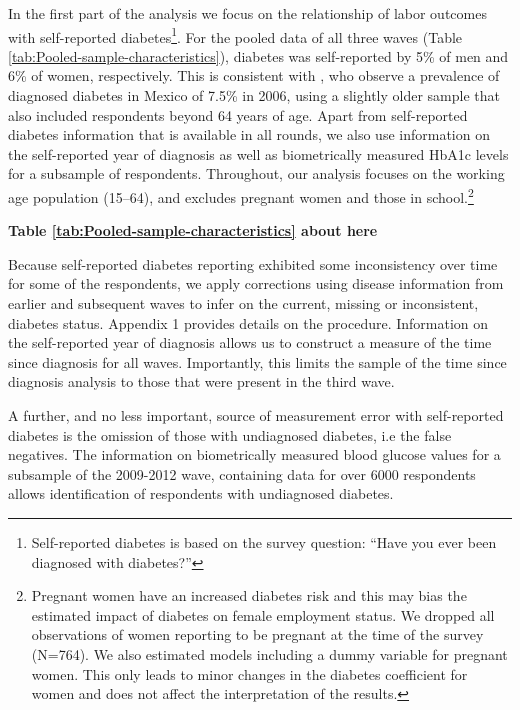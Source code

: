 \documentclass[12pt,english]{article}
\begin{document}
In the first part of the analysis we focus on the relationship of labor outcomes with self-reported diabetes\footnote{Self-reported diabetes is based on the survey question: “Have you ever been diagnosed with diabetes?”}. For the pooled data of all three waves (Table \ref{tab:Pooled-sample-characteristics}), diabetes was self-reported by 5\% of men and 6\% of women, respectively. This is consistent with \textcite{Barquera2013}, who observe a prevalence of diagnosed diabetes in Mexico of 7.5\% in 2006, using a slightly older sample that also included respondents beyond 64 years of age. Apart from self-reported diabetes information that is available in all rounds, we also use information on the self-reported year of diagnosis as well as biometrically measured \ac{HbA1c} levels for a subsample of respondents. Throughout, our analysis focuses on the working age population (15–64), and excludes pregnant women and those in school.\footnote{Pregnant women have an increased diabetes risk and this may bias the estimated impact of diabetes on female employment status. We dropped all observations of women reporting to be pregnant at the time of the survey (N=764). We also estimated models including a dummy variable for pregnant women. This only leads to minor changes in the diabetes coefficient for women and does not affect the interpretation of the results.}

\begin{center}
	\textbf{Table \ref{tab:Pooled-sample-characteristics} about here}
\end{center}

Because self-reported diabetes reporting exhibited some inconsistency over time for some of the respondents, we apply corrections using disease information from earlier and subsequent waves to infer on the current, missing or inconsistent, diabetes status. Appendix 1 provides details on the procedure. Information on the self-reported year of diagnosis allows us to construct a measure of the time since diagnosis for all waves. Importantly, this limits the sample of the time since diagnosis analysis to those that were present in the third wave. 

A further, and no less important, source of measurement error with self-reported diabetes is the omission of those with undiagnosed diabetes, i.e the false negatives. The information on biometrically measured blood glucose values for a subsample of the 2009-2012 wave, containing data for over 6000 respondents allows identification of respondents with undiagnosed diabetes. 
\end{document}
